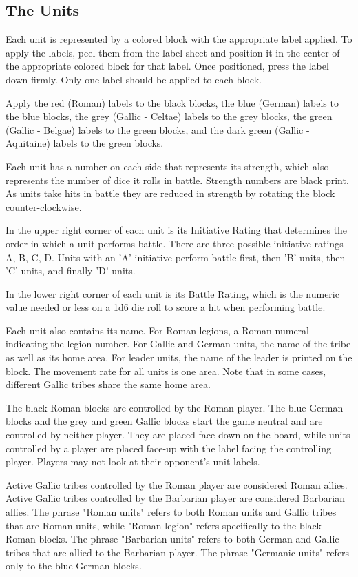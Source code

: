 \par
\subsection{The Units}
Each unit is represented by a colored block with the appropriate label applied. To apply the labels, peel them from the label sheet and position it in the center of the appropriate colored block for that label. Once positioned, press the label down firmly. Only one label should be applied to each block.

Apply the red (Roman) labels to the black blocks, the blue (German) labels to the blue blocks, the grey (Gallic - Celtae) labels to the grey blocks, the green (Gallic - Belgae) labels to the green blocks, and the dark green (Gallic - Aquitaine) labels to the green blocks.

Each unit has a number on each side that represents its strength, which also represents the number of dice it rolls in battle. Strength numbers are black print. As units take hits in battle they are reduced in strength by rotating the block counter-clockwise.

In the upper right corner of each unit is its Initiative Rating that determines the order in which a unit performs battle. There are three possible initiative ratings - A, B, C, D. Units with an 'A' initiative perform battle first, then 'B' units, then 'C' units, and finally 'D' units.

In the lower right corner of each unit is its Battle Rating, which is the numeric value needed or less on a 1d6 die roll to score a hit when performing battle.

Each unit also contains its name. For Roman legions, a Roman numeral indicating the legion number. For Gallic and German units, the name of the tribe as well as its home area. For leader units, the name of the leader is printed on the block. The movement rate for all units is one area. Note that in some cases, different Gallic tribes share the same home area.

The black Roman blocks are controlled by the Roman player. The blue German blocks and the grey and green Gallic blocks start the game neutral and are controlled by neither player. They are placed face-down on the board, while units controlled by a player are placed face-up with the label facing the controlling player. Players may not look at their opponent's unit labels.

Active Gallic tribes controlled by the Roman player are considered Roman allies. Active Gallic tribes controlled by the Barbarian player are considered Barbarian allies. The phrase "Roman units" refers to both Roman units and Gallic tribes that are Roman units, while "Roman legion" refers specifically to the black Roman blocks. The phrase "Barbarian units" refers to both German and Gallic tribes that are allied to the Barbarian player. The phrase "Germanic units" refers only to the blue German blocks.

